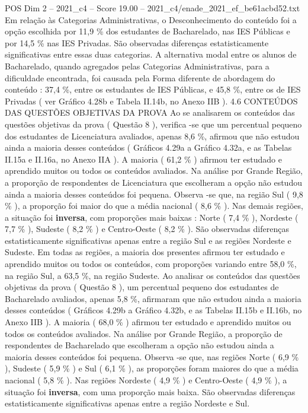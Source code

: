 \begin{textsample}{POS Dim 2 – 2021\_c4 – Score 19.00 – 2021\_c4/enade\_2021\_ef\_be61acbd52.txt}
Em relação às Categorias Administrativas, o Desconhecimento do conteúdo foi a opção escolhida por 11,9 \% dos estudantes de Bacharelado, nas IES Públicas e por 14,5 \% nas IES Privadas.
São observadas diferenças estatisticamente significativas entre essas duas categorias.
A alternativa modal entre os alunos de Bacharelado, quando agregados pelas Categorias Administrativas, para a dificuldade encontrada, foi causada pela Forma diferente de abordagem do conteúdo : 37,4 \%, entre os estudantes de IES Públicas, e 45,8 \%, entre os de IES Privadas ( ver Gráfico 4.28b e Tabela II.14b, no Anexo IIB ). 4.6 CONTEÚDOS DAS QUESTÕES OBJETIVAS DA PROVA Ao se analisarem os conteúdos das questões objetivas da prova ( Questão 8 ), verifica -se que um percentual pequeno dos estudantes de Licenciatura avaliados, apenas 8,6 \%, afirmou que não estudou ainda a maioria desses conteúdos ( Gráficos 4.29a a Gráfico 4.32a, e as Tabelas II.15a e II.16a, no Anexo IIA ).
A maioria ( 61,2 \% ) afirmou ter estudado e aprendido muitos ou todos os conteúdos avaliados.
Na análise por Grande Região, a proporção de respondentes de Licenciatura que escolheram a opção não estudou ainda a maioria desses conteúdos foi pequena.
Observa -se que, na região Sul ( 9,8 \% ), a proporção foi maior do que a média nacional ( 8,6 \% ).
Nas demais regiões, a situação foi \textbf{inversa}, com proporções mais baixas : Norte ( 7,4 \% ), Nordeste ( 7,7 \% ), Sudeste ( 8,2 \% ) e Centro-Oeste ( 8,2 \% ).
São observadas diferenças estatisticamente significativas apenas entre a região Sul e as regiões Nordeste e Sudeste.
Em todas as regiões, a maioria dos presentes afirmou ter estudado e aprendido muitos ou todos os conteúdos, com proporções variando entre 58,0 \%, na região Sul, a 63,5 \%, na região Sudeste.
Ao analisar os conteúdos das questões objetivas da prova ( Questão 8 ), um percentual pequeno dos estudantes de Bacharelado avaliados, apenas 5,8 \%, afirmaram que não estudou ainda a maioria desses conteúdos ( Gráficos 4.29b a Gráfico 4.32b, e as Tabelas II.15b e II.16b, no Anexo IIB ).
A maioria ( 68,0 \% ) afirmou ter estudado e aprendido muitos ou todos os conteúdos avaliados.
Na análise por Grande Região, a proporção de respondentes de Bacharelado que escolheram a opção não estudou ainda a maioria desses conteúdos foi pequena.
Observa -se que, nas regiões Norte ( 6,9 \% ), Sudeste ( 5,9 \% ) e Sul ( 6,1 \% ), as proporções foram maiores do que a média nacional ( 5,8 \% ).
Nas regiões Nordeste ( 4,9 \% ) e Centro-Oeste ( 4,9 \% ), a situação foi \textbf{inversa}, com uma proporção mais baixa.
São observadas diferenças estatisticamente significativas apenas entre a região Nordeste e Sul.

\end{textsample}
